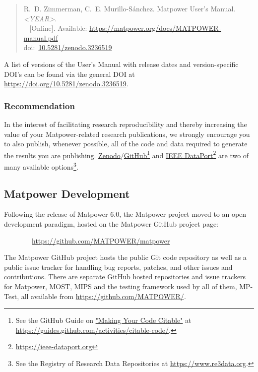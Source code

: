 \documentclass[12pt]{article}
\newcommand{\matpower}[0]{{\sc Matpower}}
\newcommand{\matpowergithuburl}[0]{https://github.com/MATPOWER/matpower}
\newcommand{\mptest}[0]{{MP-Test}}
\newcommand{\mips}[0]{{MIPS}}
\newcommand{\most}[0]{{MOST}}
\newcommand{\doi}[1]{doi:~\href{https://doi.org/#1}{#1}}
\numberwithin{equation}{section}
\numberwithin{table}{section}
\numberwithin{figure}{section}
\begin{document}
\begin{quote}
\footnotesize
R.~D. Zimmerman, C.~E. Murillo-S{\'a}nchez. \matpower{} User's Manual. \emph{\textless{}YEAR\textgreater{}}.\\~
[Online]. Available: \url{https://matpower.org/docs/MATPOWER-manual.pdf}\\
\doi{10.5281/zenodo.3236519}
\end{quote}

A list of versions of the User's Manual with release dates and
version-specific DOI's can be found via the general DOI at
\url{https://doi.org/10.5281/zenodo.3236519}.

\subsubsection*{Recommendation}

In the interest of facilitating research reproducibility and thereby
increasing the value of your \matpower{}-related research publications,
we strongly encourage you to also publish, whenever possible, all of the
code and data required to generate the results you are publishing.
\href{https://about.zenodo.org}{Zenodo}/\href{https://github.com}{GitHub}\footnote{See the GitHub Guide on \href{https://guides.github.com/activities/citable-code/}{"Making Your Code Citable"} at \url{https://guides.github.com/activities/citable-code/}.} and \href{https://ieee-dataport.org}{IEEE DataPort}\footnote{\url{https://ieee-dataport.org}} are two of many available options\footnote{See the Registry of Research Data Repositories at \url{https://www.re3data.org}.}.


\subsection{\matpower{} Development}
\label{sec:development}

Following the release of \matpower{} 6.0, the \matpower{} project moved to an open development paradigm, hosted on the \matpower{} GitHub project page:

\bigskip

~~~~~~~~\url{\matpowergithuburl}

\bigskip

The \matpower{} GitHub project hosts the public Git code repository as well as a public issue tracker for handling bug reports, patches, and other issues and contributions. There are separate GitHub hosted repositories and issue trackers for \matpower{}, \most{}, \mips{} and the testing framework used by all of them, \mptest{}, all available from \url{https://github.com/MATPOWER/}.
\end{document}
